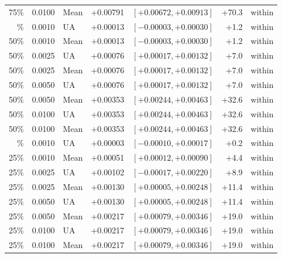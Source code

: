 \begin{table}[H]
\begin{tabular}{@{}rrlrrrl@{}}
75\% & 0.0100 & Mean & +0.00791 & $[+0.00672, +0.00913]$ & +70.3 & within \\
\addlinespace
50\% & 0.0010 & UA & +0.00013 & $[-0.00003, +0.00030]$ & +1.2 & within \\
50\% & 0.0010 & Mean & +0.00013 & $[-0.00003, +0.00030]$ & +1.2 & within \\
50\% & 0.0025 & UA & +0.00076 & $[+0.00017, +0.00132]$ & +7.0 & within \\
50\% & 0.0025 & Mean & +0.00076 & $[+0.00017, +0.00132]$ & +7.0 & within \\
50\% & 0.0050 & UA & +0.00076 & $[+0.00017, +0.00132]$ & +7.0 & within \\
50\% & 0.0050 & Mean & +0.00353 & $[+0.00244, +0.00463]$ & +32.6 & within \\
50\% & 0.0100 & UA & +0.00353 & $[+0.00244, +0.00463]$ & +32.6 & within \\
50\% & 0.0100 & Mean & +0.00353 & $[+0.00244, +0.00463]$ & +32.6 & within \\
\addlinespace
25\% & 0.0010 & UA & +0.00003 & $[-0.00010, +0.00017]$ & +0.2 & within \\
25\% & 0.0010 & Mean & +0.00051 & $[+0.00012, +0.00090]$ & +4.4 & within \\
25\% & 0.0025 & UA & +0.00102 & $[-0.00017, +0.00220]$ & +8.9 & within \\
25\% & 0.0025 & Mean & +0.00130 & $[+0.00005, +0.00248]$ & +11.4 & within \\
25\% & 0.0050 & UA & +0.00130 & $[+0.00005, +0.00248]$ & +11.4 & within \\
25\% & 0.0050 & Mean & +0.00217 & $[+0.00079, +0.00346]$ & +19.0 & within \\
25\% & 0.0100 & UA & +0.00217 & $[+0.00079, +0.00346]$ & +19.0 & within \\
25\% & 0.0100 & Mean & +0.00217 & $[+0.00079, +0.00346]$ & +19.0 & within \\
\bottomrule
\end{tabular}
\end{table}
